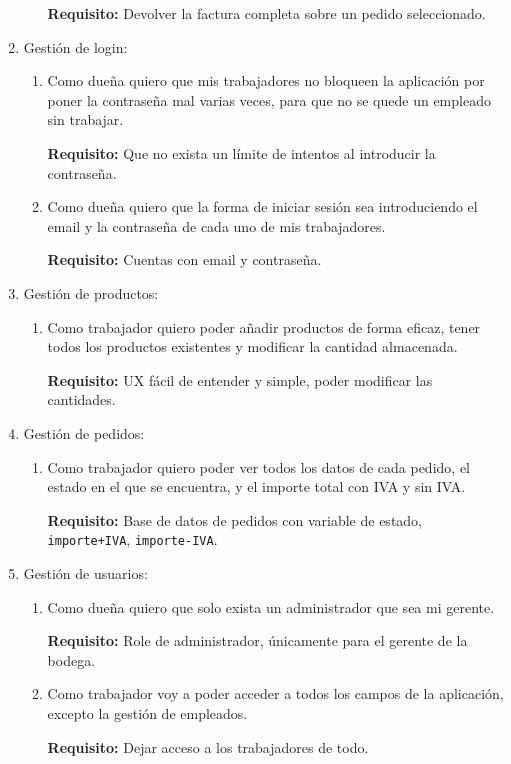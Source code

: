 \begin{enumerate}
\begin{enumerate}
        \textbf{Requisito:} Devolver la factura completa sobre un pedido seleccionado.
 
    \end{enumerate}
    
    \item Gestión de login:
    \begin{enumerate}
        \item Como dueña quiero que mis trabajadores no bloqueen la aplicación por poner la contraseña mal varias veces, para que no se quede un empleado sin trabajar.

        \textbf{Requisito:} Que no exista un límite de intentos al introducir la contraseña.

        \item Como dueña quiero que la forma de iniciar sesión sea introduciendo el email y la contraseña de cada uno de mis trabajadores.
    
        \textbf{Requisito:} Cuentas con email y contraseña.
    \end{enumerate}

    \item Gestión de productos:
    \begin{enumerate}
        \item Como trabajador quiero poder añadir productos de forma eficaz, tener todos los productos existentes y modificar la cantidad almacenada.
        
            \textbf{Requisito:} UX fácil de entender y simple, poder modificar las cantidades.
    \end{enumerate}

    \item Gestión de pedidos:
    \begin{enumerate}
        \item Como trabajador quiero poder ver todos los datos de cada pedido, el estado en el que se encuentra, y el importe total con IVA y sin IVA.
        
            \textbf{Requisito:} Base de datos de pedidos con variable de estado, \texttt{importe+IVA}, \texttt{importe-IVA}.
    \end{enumerate}

    \item Gestión de usuarios:
    \begin{enumerate}
        \item Como dueña quiero que solo exista un administrador que sea mi gerente.

        \textbf{Requisito:} Role de administrador, únicamente para el gerente de la bodega. 

        \item Como trabajador voy a poder acceder a todos los campos de la aplicación, excepto la gestión de empleados.

        \textbf{Requisito:} Dejar acceso a los trabajadores de todo.
    \end{enumerate}
\end{enumerate}
